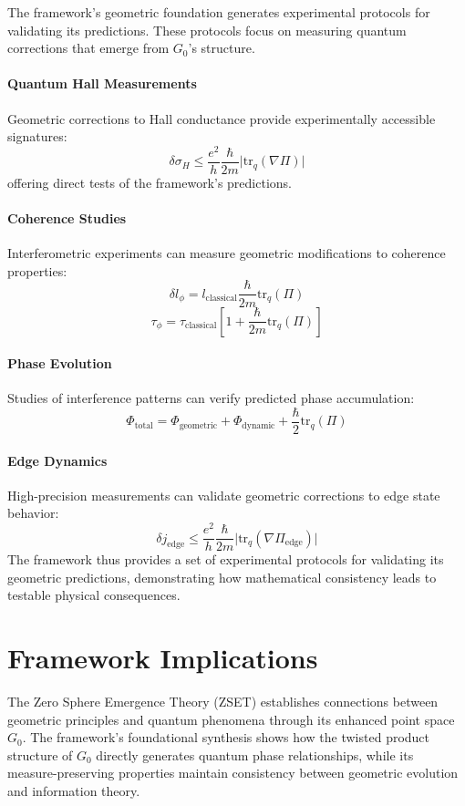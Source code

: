 \documentclass[10pt]{article}
\begin{document}
The framework's geometric foundation generates experimental protocols for validating its predictions. These protocols focus on measuring quantum corrections that emerge from \(G_0\)'s structure.

\paragraph{Quantum Hall Measurements}
Geometric corrections to Hall conductance provide experimentally accessible signatures:
\[
\delta \sigma_H \leq \frac{e^2}{h} \frac{\hbar}{2m} \big| \text{tr}_q (\nabla \Pi) \big|
\]
offering direct tests of the framework's predictions.

\paragraph{Coherence Studies}
Interferometric experiments can measure geometric modifications to coherence properties:
\[
\delta l_\phi = l_\text{classical} \frac{\hbar}{2m} \text{tr}_q(\Pi)
\]
\[
\tau_\phi = \tau_\text{classical} \left[ 1 + \frac{\hbar}{2m} \text{tr}_q(\Pi) \right]
\]
\paragraph{Phase Evolution}
Studies of interference patterns can verify predicted phase accumulation:
\[
\Phi_{\text{total}} = \Phi_{\text{geometric}} + \Phi_{\text{dynamic}} + \frac{\hbar}{2} \text{tr}_q(\Pi)
\]
\paragraph{Edge Dynamics}
High-precision measurements can validate geometric corrections to edge state behavior:
\[
\delta j_\text{edge} \leq \frac{e^2}{h} \frac{\hbar}{2m} \big| \text{tr}_q (\nabla \Pi_\text{edge}) \big|
\]
The framework thus provides a set of experimental protocols for validating its geometric predictions, demonstrating how mathematical consistency leads to testable physical consequences.

\section{Framework Implications}

The Zero Sphere Emergence Theory (ZSET) establishes connections between geometric principles and quantum phenomena through its enhanced point space \(G_0\). The framework's foundational synthesis shows how the twisted product structure of \(G_0\) directly generates quantum phase relationships, while its measure-preserving properties maintain consistency between geometric evolution and information theory.
\end{document}
